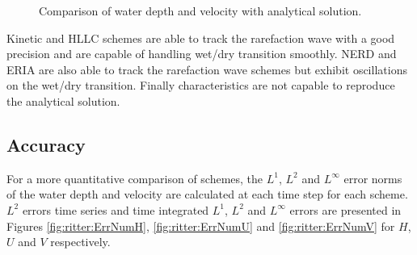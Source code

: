 \begin{figure}[H]
\begin{minipage}[t]{0.5\textwidth}
 \centering
\end{minipage}
\begin{minipage}[t]{0.5\textwidth}
 \centering
\end{minipage}
\begin{minipage}[t]{0.5\textwidth}
 \centering
\end{minipage}
\begin{minipage}[t]{0.5\textwidth}
 \centering
\end{minipage}
\begin{minipage}[t]{0.5\textwidth}
 \centering
\end{minipage}
\begin{minipage}[t]{0.5\textwidth}
 \centering
\end{minipage}
  \caption{Comparison of water depth and velocity with analytical solution.}
  \label{fig:ritter:comparison}
\end{figure}

Kinetic and HLLC schemes are able to track the rarefaction wave with a good
precision and are capable of handling wet/dry transition smoothly.
NERD and ERIA are also able to track the rarefaction wave schemes
but exhibit oscillations on the wet/dry transition.
Finally characteristics are not capable to reproduce the analytical solution.

\subsection{Accuracy}

For a more quantitative comparison of schemes, the $L^1$, $L^2$ and $L^\infty$
error norms of the water depth and velocity are calculated at each time step
for each scheme.
$L^2$ errors time series and time integrated $L^1$, $L^2$ and $L^\infty$ errors
are presented in Figures \ref{fig:ritter:ErrNumH}, \ref{fig:ritter:ErrNumU} and
\ref{fig:ritter:ErrNumV} for $H$, $U$ and $V$ respectively.

